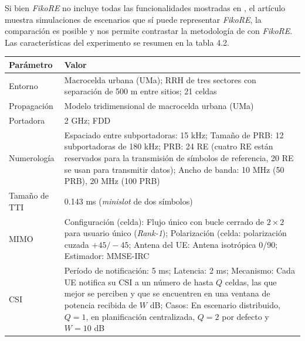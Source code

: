 \documentclass[12pt]{report} %
\begin{document}
Si bien \textit{FikoRE} no incluye todas las funcionalidades mostradas en \cite{RefWorks:66},
el artículo muestra simulaciones de escenarios que sí puede representar \textit{FikoRE},
la comparación es posible y nos permite contrastar la metodología de \cite{RefWorks:66} con \textit{FikoRE}.
Las características del experimento se resumen en la tabla 4.2.


\begin{table}[H]
	{\begin{tabular}{|P{3.0cm}|P{10cm}|}
		\hline
		\textbf{Parámetro} & \textbf{Valor} \\
		\hline
		Entorno &
		Macrocelda urbana (UMa);
		RRH de tres sectores con separación de 500 m entre sitios;
		21 celdas \\
		\hline
		Propagación &
		Modelo tridimensional de macrocelda urbana (UMa) \\
		\hline
		Portadora &
		2 GHz;
		FDD \\
		\hline
		Numerología &
		Espaciado entre subportadoras: 15 kHz;
		Tamaño de PRB: 12 subportadoras de 180 kHz;
		PRB: 24 RE (cuatro RE están reservados para la transmisión de símbolos de referencia, 20 RE se usan para transmitir datos);
		Ancho de banda: 10 MHz (50 PRB), 20 MHz (100 PRB) \\
		\hline
		Tamaño de TTI &
		0.143 ms (\textit{minislot} de dos símbolos) \\
		\hline
		MIMO &
		Configuración (celda): Flujo único con bucle cerrado de $2 \times 2$ para usuario único (\textit{Rank-1});
		Polarización (celda: polarización cuzada $+45 / -45$;
		Antena del UE: Antena isotrópica 0/90;
		Estimador: MMSE-IRC \\
		\hline
		CSI &
		Período de notificación: 5 ms;
		Latencia: 2 ms;
		Mecanismo: Cada UE notifica su CSI a un número de hasta $Q$ celdas, las que mejor se perciben y que se encuentren en una ventana de potencia recibida de $W$ dB;
		Casos: En escenario distribuido, $Q = 1$, en planificación centralizada, $Q = 2$ por defecto y $W = 10$ dB \\

\end{tabular}}
\end{table}
\end{document}
